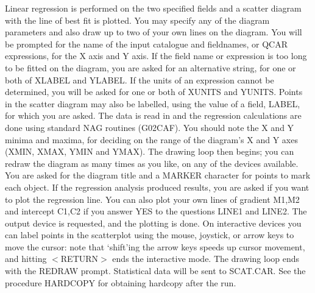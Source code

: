 Linear regression is performed on the two specified fields and a scatter
diagram with the line of best fit is plotted.
You may specify any of the diagram parameters and also draw up to two of
your own lines on the diagram.
You will be prompted for the name of the input catalogue and fieldnames, or
QCAR expressions, for the X axis and Y axis.
If the field name or expression is too long to be fitted on the diagram, you
are asked for an alternative string, for one or both of XLABEL and YLABEL.
If the units of an expression cannot be determined, you will be asked for one
or both of XUNITS and YUNITS.
Points in the scatter diagram may also be labelled, using the value of a
field, LABEL, for which you are asked.
The data is read in and the regression calculations are done using standard
NAG routines (G02CAF).
You should note the X and Y minima and maxima, for deciding on the range of
the diagram's X and Y axes (XMIN, XMAX, YMIN and YMAX).
The drawing loop then begins; you can redraw the diagram as many times as you
like, on any of the devices available.
You are asked for the diagram title and a MARKER character for points to mark
each object.
If the regression analysis produced results, you are asked if you want to plot
the regression line.
You can also plot your own lines of gradient M1,M2 and intercept C1,C2 if
you answer YES to the questions LINE1 and LINE2.
The output device is requested, and the plotting is done.
On interactive devices you can label points in the scatterplot using the
mouse, joystick, or arrow keys to move the cursor: note that `shift'ing the
arrow keys speeds up cursor movement, and hitting $<$RETURN$>$ ends the
interactive mode.
The drawing loop ends with the REDRAW prompt.
Statistical data will be sent to SCAT.CAR.
See the procedure HARDCOPY for obtaining hardcopy after the run.
